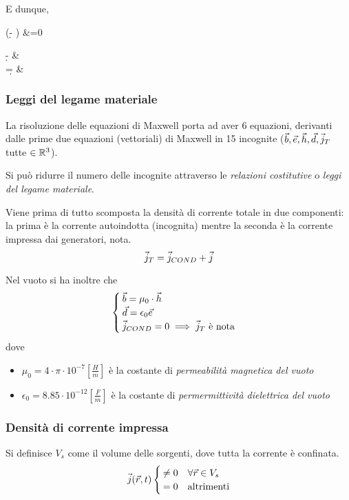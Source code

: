 E dunque,
\begin{esp}
	 \left(\diverg \d - \rho \right) &=0 \implies
	\begin{cases}
		\diverg \d - \rho &  \\
		\diverg \d = \rho & 
	\end{cases}
\end{esp}

\subsubsection{Leggi del legame materiale}
La risoluzione delle equazioni di Maxwell porta ad aver 6 equazioni, derivanti dalle prime due equazioni (vettoriali) di Maxwell in 15 incognite ($\vec{b} , \vec{e} , \vec{h} , \vec{d} , \vec{j}_T $ tutte $\in \mathbb{R}^3$).

Si può ridurre il numero delle incognite attraverso le \emph{relazioni costitutive} o \emph{leggi del legame materiale}.

Viene prima di tutto scomposta la densità di corrente totale in due componenti: la prima è la corrente autoindotta (incognita) mentre la seconda è la corrente impressa dai generatori, nota.
\begin{equation}
	\vec{j}_T = \vec{j}_{COND} + \vec{j}
\end{equation}

Nel vuoto si ha inoltre che
\begin{equation}
	\begin{cases}
		\vec{b} = \mu_0 \cdot \vec{h} \\
		\vec{d} = \epsilon_0 \vec{e} \\
		\vec{j}_{COND} = 0 \implies \vec{j}_T \text{ è nota} \\
	\end{cases}
	\label{eq:bh-de-j}
\end{equation}
dove
\begin{itemize}
	\item $\mu_0 = 4\cdot \pi \cdot 10^{-7} \left[\frac{H}{m}\right]$ è la costante di \emph{permeabilità
	magnetica del vuoto}
	\item $\epsilon_0 = 8.85 \cdot 10^{-12} \left[\frac{F}{m}\right]$ è la costante di \emph{permermittività
	dielettrica del vuoto}
\end{itemize}

\subsubsection{Densità di corrente impressa}
Si definisce $V_s$ come il volume delle sorgenti, dove tutta la corrente è confinata.
\begin{equation} \vec{j}(\vec{r},t)
	\begin{cases}
		\neq 0 & \forall \vec{r} \in V_s \\
		=0 & \text{altrimenti}
	\end{cases}
	\label{eq:correnti}
\end{equation}

